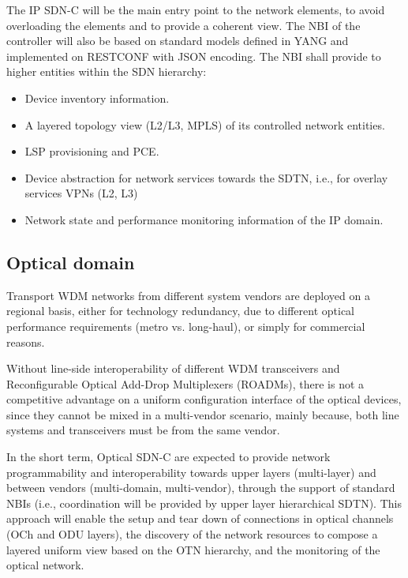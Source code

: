 \documentclass[a4paper,fleqn]{cas-dc}
\begin{document}
The IP SDN-C will be the main entry point to the network elements, to avoid overloading the elements and to provide a coherent view. The NBI of the controller will also be based on standard models defined in YANG and implemented on RESTCONF with JSON encoding. The NBI shall provide to higher entities within the SDN hierarchy:
\begin{itemize}
\item Device inventory information.
\item A layered topology view (L2/L3, MPLS) of its controlled network entities.
\item LSP provisioning and PCE.
\item Device abstraction for network services towards the SDTN, i.e., for overlay services VPNs (L2, L3)
\item Network state and performance monitoring information of the IP domain. 
\end{itemize}

\subsection{Optical domain}
\label{section:dwdm}
Transport WDM networks from different system vendors are deployed on a regional basis, either for technology redundancy, due to different optical performance requirements (metro vs. long-haul), or simply for commercial reasons. 

Without line-side interoperability of different WDM transceivers and Reconfigurable Optical Add-Drop Multiplexers (ROADMs), there is not a competitive advantage on a uniform configuration interface of the optical devices, since they cannot be mixed in a multi-vendor scenario, mainly because, both line systems and transceivers must be from the same vendor.

In the short term, Optical SDN-C are expected to provide network programmability and interoperability towards upper layers (multi-layer) and between vendors (multi-domain, multi-vendor), through the support of standard NBIs (i.e., coordination will be provided by upper layer hierarchical SDTN). This approach will enable the setup and tear down of connections in optical channels (OCh and ODU layers), the discovery of the network resources to compose a layered uniform view based on the OTN hierarchy, and the monitoring of the optical network.
\end{document}
